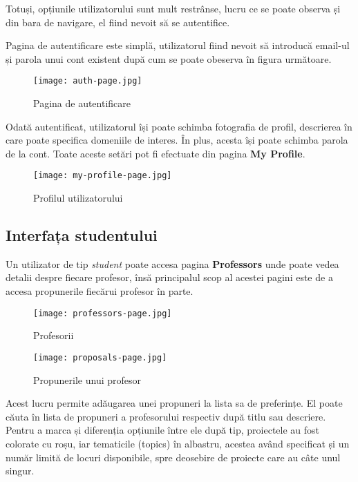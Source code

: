 Totuși, opțiunile utilizatorului sunt mult restrânse, lucru ce se poate observa și din bara de navigare, el fiind nevoit să se autentifice.

Pagina de autentificare este simplă, utilizatorul fiind nevoit să introducă email-ul și parola unui cont existent după cum se poate obeserva în figura următoare.

\begin{figure}[H]
	\centering
	\texttt{[image: auth-page.jpg]}
	\caption{Pagina de autentificare}
\end{figure}

Odată autentificat, utilizatorul își poate schimba fotografia de profil, descrierea în care poate specifica domeniile de interes. În plus, acesta își poate schimba parola de la cont. Toate aceste setări pot fi efectuate din pagina \textbf{My Profile}.

\begin{figure}[H]
	\centering
	\texttt{[image: my-profile-page.jpg]}
	\caption{Profilul utilizatorului}
\end{figure}

\subsection{Interfața studentului}

Un utilizator de tip \textit{student} poate accesa pagina \textbf{Professors} unde poate vedea detalii despre fiecare profesor, însă principalul scop al acestei pagini este de a accesa propunerile fiecărui profesor în parte.

\begin{figure}[H]
	\centering
	\texttt{[image: professors-page.jpg]}
	\caption{Profesorii}
\end{figure}

\begin{figure}[H]
	\centering
	\texttt{[image: proposals-page.jpg]}
	\caption{Propunerile unui profesor}
\end{figure}

Acest lucru permite adăugarea unei propuneri la lista sa de preferințe. El poate căuta în lista de propuneri a profesorului respectiv după titlu sau descriere. Pentru a marca și diferenția opțiunile între ele după tip, proiectele au fost colorate cu roșu, iar tematicile (topics) în albastru, acestea având specificat și un număr limită de locuri disponibile, spre deosebire de proiecte care au câte unul singur. 

